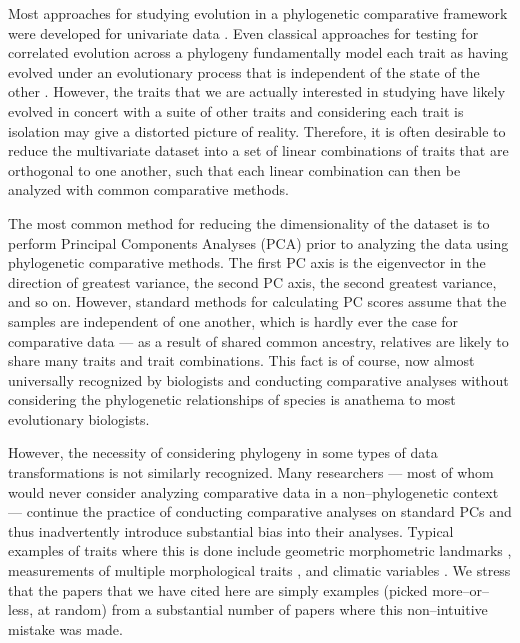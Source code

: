 \documentclass[a4paper,12pt]{article}
\begin{document}
Most approaches for studying evolution in a phylogenetic comparative framework were developed for univariate data \citep[reviewed in][]{PennellHarmon}. Even classical approaches for testing for correlated evolution across a phylogeny \citep[e.g.,][]{Felsenstein1985, Grafen1989, HarveyPagel1991} fundamentally model each trait as having evolved under an evolutionary process that is independent of the state of the other \citep{HansenOrzack2005}. However, the traits that we are actually interested in studying have likely evolved in concert with a suite of other traits and considering each trait is isolation may give a distorted picture of reality. Therefore, it is often desirable to reduce the multivariate dataset into a set of linear combinations of traits that are orthogonal to one another, such that each linear combination can then be analyzed with common comparative methods.

The most common method for reducing the dimensionality of the dataset is to perform Principal Components Analyses (PCA) prior to analyzing the data using phylogenetic comparative methods. The first PC axis is the eigenvector in the direction of greatest variance, the second PC axis, the second greatest variance, and so on. However, standard methods for calculating PC scores assume that the samples are independent of one another, which is hardly ever the case for comparative data --- as a result of shared common ancestry, relatives are likely to share many traits and trait combinations. This fact is of course, now almost universally recognized by biologists and conducting comparative analyses without considering the phylogenetic relationships of species is anathema to most evolutionary biologists. 

However, the necessity of considering phylogeny in some types of data transformations \citep{Revell2008} is not similarly recognized. Many researchers --- most of whom would never consider analyzing comparative data in a non--phylogenetic context --- continue the practice of conducting comparative analyses on standard PCs and thus inadvertently introduce substantial bias into their analyses. Typical examples of traits where this is done include geometric morphometric landmarks \citep[e.g.,][]{Dornburg2011, Hunt2013}, measurements of multiple morphological traits \citep[e.g.,][]{Harmon2010, BergmannIrshick2012, Weir2012, Pienaar2013, Price2014}, and climatic variables \citep[e.g.,][]{KozakWiens2010, Schnitzler2012}. We stress that the papers that we have cited here are simply examples (picked more--or--less, at random) from a substantial number of papers where this non--intuitive mistake was made.
\end{document}

